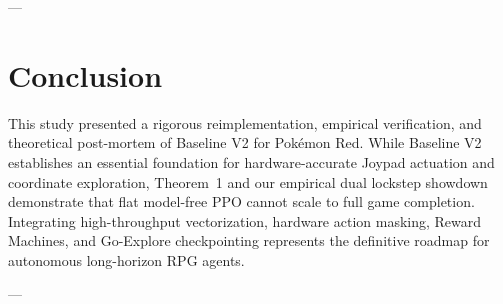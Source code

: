 \documentclass[conference]{IEEEtran}
\begin{document}
---

\section{Conclusion}
This study presented a rigorous reimplementation, empirical verification, and theoretical post-mortem of Baseline V2 for Pok{\'e}mon Red. While Baseline V2 establishes an essential foundation for hardware-accurate Joypad actuation and coordinate exploration, Theorem~1 and our empirical dual lockstep showdown demonstrate that flat model-free PPO cannot scale to full game completion. Integrating high-throughput vectorization, hardware action masking, Reward Machines, and Go-Explore checkpointing represents the definitive roadmap for autonomous long-horizon RPG agents.

---



\end{document}
